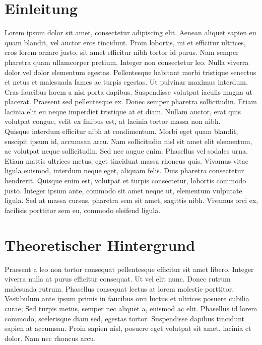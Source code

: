\documentclass[a4paper, ngerman, oneside, 10pt]{article}
\begin{document}


\section{Einleitung}
Lorem ipsum dolor sit amet, consectetur adipiscing elit. Aenean aliquet sapien eu quam blandit, vel auctor eros tincidunt. Proin lobortis, mi et efficitur ultrices, eros lorem ornare justo, sit amet efficitur nibh tortor id purus. Nam semper pharetra quam ullamcorper pretium. Integer non consectetur leo. Nulla viverra dolor vel dolor elementum egestas. Pellentesque habitant morbi tristique senectus et netus et malesuada fames ac turpis egestas. Ut pulvinar maximus interdum. Cras faucibus lorem a nisl porta dapibus. Suspendisse volutpat iaculis magna ut placerat. Praesent sed pellentesque ex. Donec semper pharetra sollicitudin. Etiam lacinia elit eu neque imperdiet tristique at et diam. Nullam auctor, erat quis volutpat congue, velit ex finibus est, at lacinia tortor massa non nibh.\\
Quisque interdum efficitur nibh at condimentum. Morbi eget quam blandit, suscipit ipsum id, accumsan arcu. Nam sollicitudin nisl sit amet elit elementum, ac volutpat neque sollicitudin. Sed nec augue enim. Phasellus vel sodales urna. Etiam mattis ultrices metus, eget tincidunt massa rhoncus quis. Vivamus vitae ligula euismod, interdum neque eget, aliquam felis. Duis pharetra consectetur hendrerit. Quisque enim est, volutpat et turpis consectetur, lobortis commodo justo. Integer ipsum ante, commodo sit amet neque ut, elementum vulputate ligula. Sed at massa cursus, pharetra sem sit amet, sagittis nibh. Vivamus orci ex, facilisis porttitor sem eu, commodo eleifend ligula.

\section{Theoretischer Hintergrund}
Praesent a leo non tortor consequat pellentesque efficitur sit amet libero. Integer viverra nulla at purus efficitur consequat. Ut vel elit nunc. Donec rutrum malesuada rutrum. Phasellus consequat lectus at lorem molestie porttitor. Vestibulum ante ipsum primis in faucibus orci luctus et ultrices posuere cubilia curae; Sed turpis metus, semper nec aliquet a, euismod ac elit. Phasellus id lorem commodo, scelerisque diam sed, egestas tortor. Suspendisse dapibus tincidunt sapien at accumsan. Proin sapien nisl, posuere eget volutpat sit amet, lacinia et dolor. Nam nec rhoncus arcu.
\end{document}
